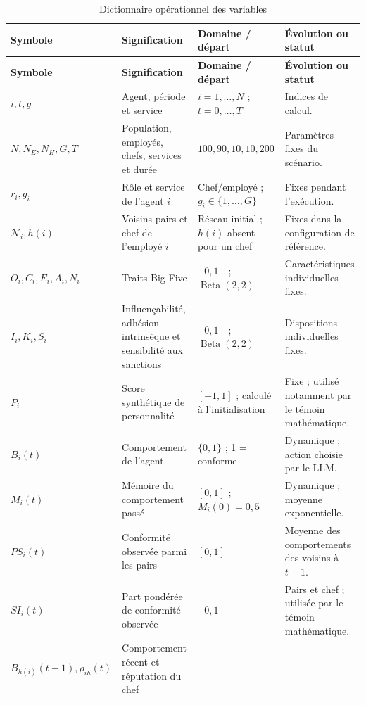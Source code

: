 \documentclass[10pt,a4paper]{article}
\renewcommand{\arraystretch}{1.12}
\begin{document}
\footnotesize
\renewcommand{\arraystretch}{1.03}
\begin{longtable}{@{}L{27mm}L{48mm}L{38mm}L{44mm}@{}}
\caption{Dictionnaire opérationnel des variables}
\label{tab:variables}\\
\toprule
{}
\color{white}\textbf{Symbole} &
\color{white}\textbf{Signification} &
\color{white}\textbf{Domaine / départ} &
\color{white}\textbf{Évolution ou statut}\\
\midrule
\endfirsthead
\toprule
{}
\color{white}\textbf{Symbole} &
\color{white}\textbf{Signification} &
\color{white}\textbf{Domaine / départ} &
\color{white}\textbf{Évolution ou statut}\\
\midrule
\endhead
\bottomrule
\endfoot
$i,t,g$ &
Agent, période et service &
$i=1,\ldots,N$ ; $t=0,\ldots,T$ &
Indices de calcul.\\
$N,N_E,N_H,G,T$ &
Population, employés, chefs, services et durée &
$100,90,10,10,200$ &
Paramètres fixes du scénario.\\
$r_i,g_i$ &
Rôle et service de l’agent $i$ &
Chef/employé ; $g_i\in\{1,\ldots,G\}$ &
Fixes pendant l’exécution.\\
$\mathcal N_i,h(i)$ &
Voisins pairs et chef de l’employé $i$ &
Réseau initial ; $h(i)$ absent pour un chef &
Fixes dans la configuration de référence.\\
$O_i,C_i,E_i,A_i,N_i$ &
Traits Big Five &
$[0,1]$ ; $\operatorname{Beta}(2,2)$ &
Caractéristiques individuelles fixes.\\
$I_i,K_i,S_i$ &
Influençabilité, adhésion intrinsèque et sensibilité aux sanctions &
$[0,1]$ ; $\operatorname{Beta}(2,2)$ &
Dispositions individuelles fixes.\\
$P_i$ &
Score synthétique de personnalité &
$[-1,1]$ ; calculé à l’initialisation &
Fixe ; utilisé notamment par le témoin mathématique.\\
$B_i(t)$ &
Comportement de l’agent &
$\{0,1\}$ ; 1 = conforme &
Dynamique ; action choisie par le LLM.\\
$M_i(t)$ &
Mémoire du comportement passé &
$[0,1]$ ; $M_i(0)=0{,}5$ &
Dynamique ; moyenne exponentielle.\\
$PS_i(t)$ &
Conformité observée parmi les pairs &
$[0,1]$ &
Moyenne des comportements des voisins à $t-1$.\\
$SI_i(t)$ &
Part pondérée de conformité observée &
$[0,1]$ &
Pairs et chef ; utilisée par le témoin mathématique.\\
$B_{h(i)}(t-1),\rho_{ih}(t)$ &
Comportement récent et réputation du chef &

\end{longtable}
\end{document}
